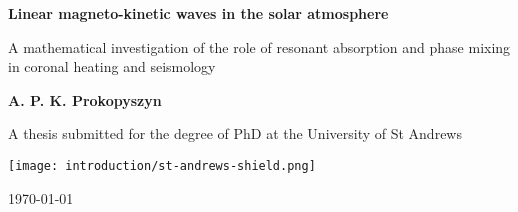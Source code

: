 \begin{titlepage}
    \begin{center}
        
        \Huge
        \textbf{Linear magneto-kinetic waves in the solar atmosphere}
        
        \vspace{0.5cm}
        \LARGE
        A mathematical investigation of the role of resonant absorption and phase mixing in coronal heating and seismology
        
        \vspace{1cm}
        
        \textbf{A. P. K. Prokopyszyn}
        
        \vspace{1cm}
        
        A thesis submitted for the degree of PhD at the University of St Andrews
        
        \vspace{3cm}
        
        \texttt{[image: introduction/st-andrews-shield.png]}
        
        \vspace{0.1cm}
        
        \today
        
    \end{center}
\end{titlepage}



            


            
            
     
            
            
